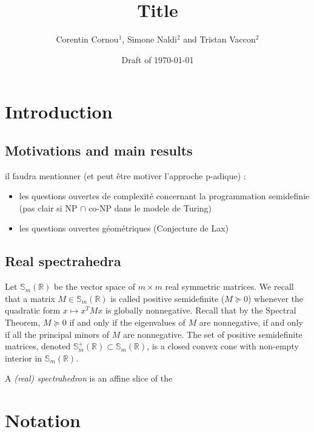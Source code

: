 \documentclass[a4paper,12pt]{article}
\title{\bf Title}
\newcommand{\R}{\mathbb{R}} %
\newcommand{\sym}{\mathbb{S}} %
\begin{document}
\author{Corentin Cornou$^{1}$, Simone Naldi$^2$ and Tristan Vaccon$^2$}


\date{Draft of \today}

\maketitle

\begin{abstract}
\end{abstract}


\section{Introduction}
\subsection{Motivations and main results}


il faudra mentionner (et peut être motiver l'approche p-adique) :
\begin{itemize}
\item les questions ouvertes de complexité concernant la programmation semidefinie (pas clair si NP $\cap$ co-NP
  dans le modele de Turing)
\item les questions ouvertes géométriques (Conjecture de Lax)
\end{itemize}

\subsection{Real spectrahedra}

Let $\sym_m(\R)$ be the vector space of $m \times m$ real symmetric matrices. We recall that
a matrix $M \in \sym_m(\R)$ is called positive semidefinite ($M \succeq 0$) whenever the quadratic
form $x \mapsto x^TMx$ is globally nonnegative. Recall that by the Spectral Theorem, $M \succeq 0$
if and only if the eigenvalues of $M$ are nonnegative, if and only if all the principal minors of
$M$ are nonnegative. The set of positive semidefinite matrices, denoted $\sym_m^+(\R) \subset \sym_m(\R)$,
is a closed convex cone with non-empty interior in $\sym_m(\R)$.

A {\it (real) spectrahedron} is an affine slice of the 

\section{Notation}
\end{document}
